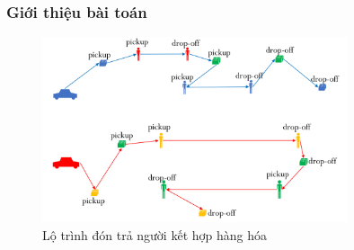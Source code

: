 \documentclass{beamer}
\begin{document}
	\begin{frame}
		\frametitle{Giới thiệu bài toán}
		\begin{figure}
			\centering
			\caption{Lộ trình đón trả người kết hợp hàng hóa}
			\includegraphics[width=0.8\textwidth]{../docs/taxi.png}
		\end{figure}
	\end{frame}
	
	
%	
%	
%	
%	
%
%	
	
\end{document}
